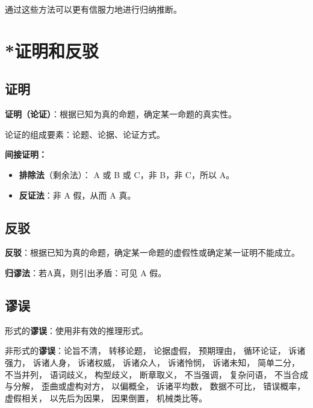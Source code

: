 \documentclass[12pt,onecolumn,a4paper]{book}
\newtheorem*{example}{例}
\numberwithin{table}{subsection}
\numberwithin{equation}{subsection}
\begin{document}
通过这些方法可以更有信服力地进行归纳推断。

\chapter{*证明和反驳}

\section{证明}
\textbf{证明（论证）}：根据已知为真的命题，确定某一命题的真实性。

论证的组成要素：论题、论据、论证方式。

\textbf{间接证明：}

\begin{itemize}[itemsep=0pt,parsep=0pt]
    \item \textbf{排除法}（剩余法）： A 或 B 或 C，非 B，非 C，所以 A。
    \item \textbf{反证法}：非 A 假，从而 A 真。
\end{itemize}

\section{反驳}
\textbf{反驳}：根据已知为真的命题，确定某一命题的虚假性或确定某一证明不能成立。

\textbf{归谬法}：若A真，则引出矛盾：可见 A 假。

\section{谬误}
形式的\textbf{谬误}：使用非有效的推理形式。

非形式的\textbf{谬误}：论旨不清， 转移论题， 论据虚假， 预期理由， 循环论证， 诉诸强力， 诉诸人身， 诉诸权威， 诉诸众人， 诉诸怜悯， 诉诸未知， 简单二分， 不当并列， 语词歧义， 构型歧义， 断章取义， 不当强调， 复杂问语， 不当合成与分解， 歪曲或虚构对方， 以偏概全， 诉诸平均数， 数据不可比， 错误概率，虚假相关， 以先后为因果， 因果倒置， 机械类比等。



\end{document}
